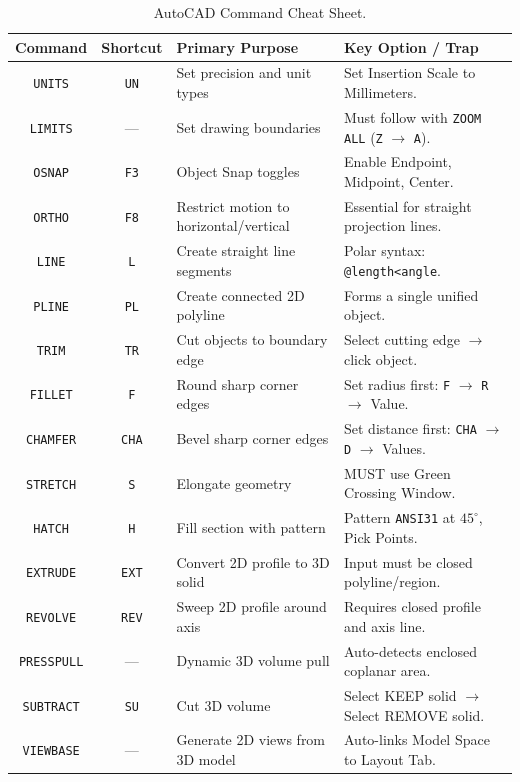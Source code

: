 \begin{table}[htbp]
\centering
\small
\begin{tabularx}{\textwidth}{c c X X}
\toprule
\textbf{Command} & \textbf{Shortcut} & \textbf{Primary Purpose} & \textbf{Key Option / Trap} \\
\midrule
\texttt{UNITS} & \texttt{UN} & Set precision and unit types & Set Insertion Scale to Millimeters. \\
\texttt{LIMITS} & — & Set drawing boundaries & Must follow with \texttt{ZOOM ALL} (\texttt{Z} $\to$ \texttt{A}). \\
\texttt{OSNAP} & \texttt{F3} & Object Snap toggles & Enable Endpoint, Midpoint, Center. \\
\texttt{ORTHO} & \texttt{F8} & Restrict motion to horizontal/vertical & Essential for straight projection lines. \\
\texttt{LINE} & \texttt{L} & Create straight line segments & Polar syntax: \texttt{@length<angle}. \\
\texttt{PLINE} & \texttt{PL} & Create connected 2D polyline & Forms a single unified object. \\
\texttt{TRIM} & \texttt{TR} & Cut objects to boundary edge & Select cutting edge $\to$ click object. \\
\texttt{FILLET} & \texttt{F} & Round sharp corner edges & Set radius first: \texttt{F} $\to$ \texttt{R} $\to$ Value. \\
\texttt{CHAMFER} & \texttt{CHA} & Bevel sharp corner edges & Set distance first: \texttt{CHA} $\to$ \texttt{D} $\to$ Values. \\
\texttt{STRETCH} & \texttt{S} & Elongate geometry & MUST use Green Crossing Window. \\
\texttt{HATCH} & \texttt{H} & Fill section with pattern & Pattern \texttt{ANSI31} at $45^\circ$, Pick Points. \\
\texttt{EXTRUDE} & \texttt{EXT} & Convert 2D profile to 3D solid & Input must be closed polyline/region. \\
\texttt{REVOLVE} & \texttt{REV} & Sweep 2D profile around axis & Requires closed profile and axis line. \\
\texttt{PRESSPULL} & — & Dynamic 3D volume pull & Auto-detects enclosed coplanar area. \\
\texttt{SUBTRACT} & \texttt{SU} & Cut 3D volume & Select KEEP solid $\to$ Select REMOVE solid. \\
\texttt{VIEWBASE} & — & Generate 2D views from 3D model & Auto-links Model Space to Layout Tab. \\
\bottomrule
\end{tabularx}
\caption{AutoCAD Command Cheat Sheet.}
\label{tab:autocad-cheat-sheet}
\end{table}

